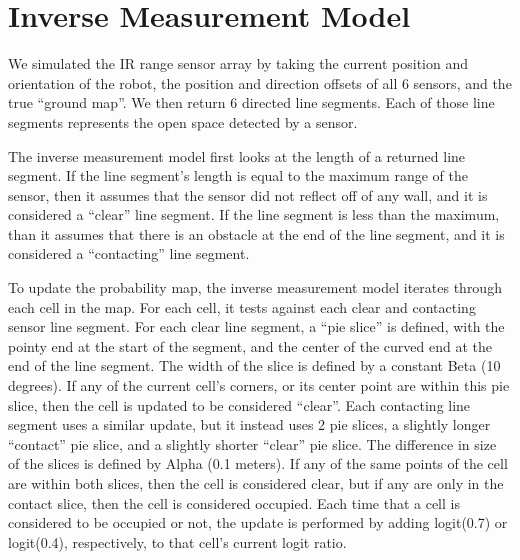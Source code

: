 \documentclass[12pt]{article}
\begin{document}


\newpage
\singlespacing
{}
\section{Inverse Measurement Model}
\setlength{\parindent}{1cm}

We simulated the IR range sensor array by taking the current position and orientation of the robot, the position and direction offsets of all 6 sensors, and the true ``ground map''. We then return 6 directed line segments. Each of those line segments represents the open space detected by a sensor.

The inverse measurement model first looks at the length of a returned line segment. If the line segment’s length is equal to the maximum range of the sensor, then it assumes that the sensor did not reflect off of any wall, and it is considered a ``clear'' line segment. If the line segment is less than the maximum, than it assumes that there is an obstacle at the end of the line segment, and it is considered a ``contacting'' line segment.

To update the probability map, the inverse measurement model iterates through each cell in the map. For each cell, it tests against each clear and contacting sensor line segment.
For each clear line segment, a ``pie slice'' is defined, with the pointy end at the start of the segment, and the center of the curved end at the end of the line segment. The width of the slice is defined by a constant Beta (10 degrees). If any of the current cell's corners, or its center point are within this pie slice, then the cell is updated to be considered ``clear''.
Each contacting line segment uses a similar update, but it instead uses 2 pie slices, a slightly longer ``contact'' pie slice, and a slightly shorter ``clear'' pie slice. The difference in size of the slices is defined by Alpha (0.1 meters). If any of the same points of the cell are within both slices, then the cell is considered clear, but if any are only in the contact slice, then the cell is considered occupied.
Each time that a cell is considered to be occupied or not, the update is performed by adding logit(0.7) or logit(0.4), respectively, to that cell's current logit ratio.
\end{document}
